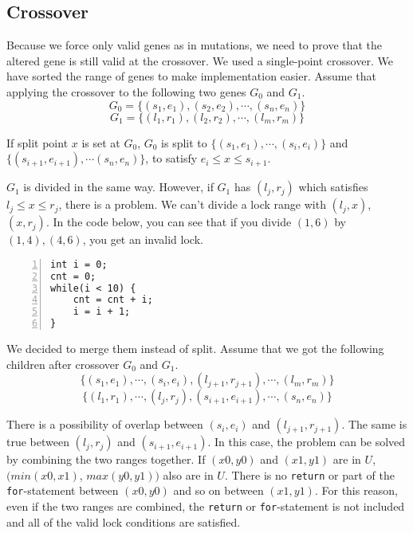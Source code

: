 \subsection{Crossover}

Because we force only valid genes as in mutations, we need to prove that the altered gene is still valid at the crossover. We used a single-point crossover. We have sorted the range of genes to make implementation easier. Assume that applying the crossover to the following two genes $G_{0}$ and $G_{1}$.
\[G_{0} = \{(s_{1}, e_{1}), (s_{2}, e_{2}), \cdots , (s_{n}, e_{n}) \}\]
\[G_{1} = \{(l_{1}, r_{1}), (l_{2}, r_{2}), \cdots , (l_{m}, r_{m}) \}\] 

If split point $x$ is set at $G_{0}$, $G_{0}$ is split to $\{(s_{1}, e_{1}), \cdots, (s_{i}, e_{i})\}$ and $\{(s_{i+1}, e_{i+1}), \cdots (s_{n}, e_{n})\}$, to satisfy $e_{i} \leq x \leq s_{i+1}$.

$G_ {1}$ is divided in the same way. However, if $G_{1}$ has $(l_{j}, r_{j})$ which satisfies $l_{j} \leq x \leq r_{j}$, there is a problem. We can't divide a lock range with $ (l_ {j}, x) $, $ (x, r_ {j}) $. In the code below, you can see that if you divide $ (1, 6) $ by $ (1,4), (4, 6) $, you get an invalid lock.

\begin{lstlisting}[frame=tb, xleftmargin=2em, framexleftmargin=1.5em, numbers=left]
int i = 0;
cnt = 0;
while(i < 10) {
    cnt = cnt + i;
    i = i + 1;
}
\end{lstlisting}

We decided to merge them instead of split. Assume that we got the following children after crossover $G_{0}$ and $G_{1}$.
\[\{ (s_{1}, e_{1}),\cdots,(s_{i}, e_{i}), (l_{j+1}, r_{j+1}), \cdots, (l_{m}, r_{m}) \}\]
\[\{ (l_{1}, r_{1}),\cdots,(l_{j},r_{j}), (s_{i+1}, e_{i+1}), \cdots, (s_{n}, e_{n}) \}\]

There is a possibility of overlap between $(s_{i}, e_{i})$ and $(l_{j+1}, r_{j+1})$. The same is true between $(l_{j}, r_{j})$ and $(s_{i+1}, e_{i+1})$. In this case, the problem can be solved by combining the two ranges together. If $(x0,y0)$ and $(x1,y1)$ are in $U$, $(min(x0,x1)$, $max(y0,y1))$ also are in $U$. There is no \verb|return| or part of the \verb|for|-statement between $(x0,y0)$ and so on between $(x1,y1)$. For this reason, even if the two ranges are combined, the \verb|return| or \verb|for|-statement is not included and all of the valid lock conditions are satisfied.